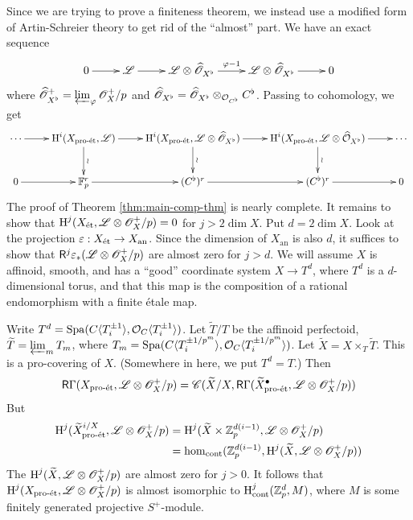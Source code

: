 Since we are trying to prove a finiteness theorem, we instead use a modified form 
of Artin-Schreier theory to get rid of the ``almost'' part. We have an exact sequence 
\[\xymatrix{
  0 \ar[r] 
    & \sL \ar[r] 
    & \sL\otimes \widehat \sO_{X^\flat} \ar[r]^-{\varphi-1} 
    & \sL\otimes\widehat\sO_{X^\flat} \ar[r] 
    & 0
}\]
where $\widehat{\mathscr{O}}_{X^\flat}^+ = \varprojlim_\varphi \mathscr{O}_X^+/p$ and 
$\widehat{\mathscr{O}}_{X^\flat} = \widehat{\mathscr{O}}_{X^\flat}\otimes_{\mathcal{O}_{C^\flat}} C^\flat$. 
Passing to cohomology, we get 
\[\xymatrix{
  \cdots\ar[r] 
    & \h^i(X_\proet,\sL) \ar[r] \ar[d]^-\wr 
    & \h^i(X_\proet,\sL\otimes \widehat\sO_{X^\flat}) \ar[r] \ar[d]^-\wr 
    & \h^i(X_\proet,\sL\otimes \widehat\cO_{X^\flat}) \ar[r] \ar[d]^-\wr 
    & \cdots \\
  0 \ar[r] 
    & \dF_p^r \ar[r] 
    & (C^\flat)^r \ar[r] 
    & (C^\flat)^r \ar[r] 
    & 0
}\]
The proof of Theorem \ref{thm:main-comp-thm} is nearly complete. It remains to 
show that $\operatorname{H}^j(X_{\textnormal{\'et}},\mathscr{L}\otimes \mathscr{O}_X^+/p)=0$ for 
$j>2\dim X$. Put $d=2\dim X$. Look at the projection 
$\varepsilon:X_{\textnormal{\'et}} \to X_\text{an}$. Since the dimension of $X_\text{an}$ is also $d$, it 
suffices to show that $\mathsf R^j \varepsilon_\ast(\mathscr{L}\otimes \mathscr{O}_X^+/p)$ are almost 
zero for $j>d$. We will assume $X$ is affinoid, smooth, and has a ``good'' coordinate 
system $X\to T^d$, where $T^d$ is a $d$-dimensional torus, and that this map is the 
composition of a rational endomorphism with a finite \'etale map. 

Write $T^d=\operatorname{Spa}(C\langle T_i^{\pm 1}\rangle,\mathcal{O}_C\langle T_i^{\pm 1}\rangle)$. 
Let $\widetilde T/T$ be the affinoid perfectoid, 
$\widetilde T=\varprojlim_m T_m$, where 
$T_m=\operatorname{Spa}(C\langle T_i^{\pm 1/p^m}\rangle,\mathcal{O}_C\langle T_i^{\pm 1/p^m}\rangle)$. Let $\widetilde X=X\times_T \widetilde T$. This is a pro-covering of $X$. (Somewhere 
in here, we put $T^d=T$.) 
Then 
\[
  \mathsf R\Gamma(X_{\textnormal{pro-\'et}},\mathscr{L}\otimes \mathscr{O}_X^+/p) = \mathscr C(\widetilde X/X,\mathsf R\Gamma(\widetilde X_{\textnormal{pro-\'et}}^\bullet,\mathscr{L}\otimes \mathscr{O}_X^+/p)) 
\]
But 
\begin{align*}
  \operatorname{H}^j(\widetilde X_{\textnormal{pro-\'et}}^{i/X},\mathscr{L}\otimes \mathscr{O}_X^+/p) 
    &= \operatorname{H}^j(\widetilde X\times \mathbb{Z}_p^{d(i-1)},\mathscr{L}\otimes \mathscr{O}_X^+/p) \\
    &= \hom_\text{cont}(\mathbb{Z}_p^{d(i-1)},\operatorname{H}^j(\widetilde X,\mathscr{L}\otimes \mathscr{O}_X^+/p))
\end{align*}
The $\operatorname{H}^j(\widetilde X,\mathscr{L}\otimes \mathscr{O}_X^+/p)$ are almost zero for $j>0$. It follows that 
$\operatorname{H}^j(X_{\textnormal{pro-\'et}},\mathscr{L}\otimes \mathscr{O}_X^+/p)$ is almost isomorphic to 
$\operatorname{H}_\text{cont}^j(\mathbb{Z}_p^d,M)$, where $M$ is some finitely generated projective 
$S^+$-module. 

